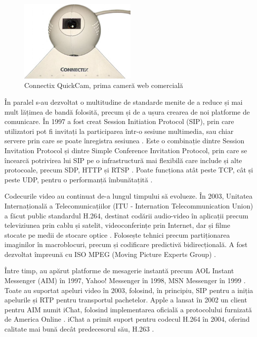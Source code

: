 \begin{figure}[H]
    \centering
    \includegraphics[width=5.7cm]{figures/quickcam.jpg}
    \caption{Connectix QuickCam, prima cameră web comercială}
    \label{QuickCam}
\end{figure}
\indent \par În paralel s-au dezvoltat o multitudine de standarde menite de a reduce și mai mult lățimea de bandă folosită, precum și de a ușura crearea de noi platforme de comunicare. În 1997 a fost creat Session Initiation Protocol (SIP), prin care utilizatori pot fi invitați la participarea într-o sesiune multimedia, sau chiar servere prin care se poate înregistra sesiunea \cite{rfc2543}. Este o combinație dintre Session Invitation Protocol și dintre Simple Conference Invitation Protocol, prin care se încearcă potrivirea lui SIP pe o infrastructură mai flexibilă care include și alte protocoale, precum SDP, HTTP și RTSP \cite{rfc2543}. Poate funcționa atât peste TCP, cât și peste UDP, pentru o performanță îmbunătațită \cite{rfc2543}.
\indent \par Codecurile video au continuat de-a lungul timpului să evolueze. În 2003, Unitatea Internațională a Telecomunicațiilor (ITU - Internation Telecommunication Union) a făcut public standardul H.264, destinat codării audio-video în aplicații precum televiziunea prin cablu și satelit, videoconferințe prin Internet, dar și filme stocate pe medii de stocare optice \cite{H.264}. Folosește tehnici precum partiționarea imaginilor în macroblocuri, precum și codificare predictivă bidirecțională. A fost dezvoltat împreună cu ISO MPEG (Moving Picture Experts Group) \cite{H.264}.
\indent \par Între timp, au apărut platforme de mesagerie instantă precum AOL Instant Messenger (AIM) în 1997, Yahoo! Messenger în 1998, MSN Messenger în 1999 \cite{Wolfe2019}. Toate au suportat apeluri video în 2003, folosind, în principiu, SIP pentru a iniția apelurile și RTP pentru transportul pachetelor. Apple a lansat în 2002 un client pentru AIM numit iChat, folosind implementarea oficială a protocolului furnizată de America Online \cite{Wolfe2019}. iChat a primit suport pentru codecul H.264 în 2004, oferind calitate mai bună decât predecesorul său, H.263 \cite{Royal2007}.
